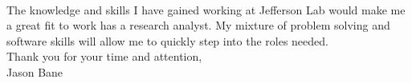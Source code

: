 \documentclass[12pt,letterpaper]{article}
\begin{document}
\paragraph{}The knowledge and skills I have gained working at Jefferson Lab would make me a great fit to work has a research analyst. My mixture of problem solving and software skills will allow me to quickly step into the roles needed.      
\\

\noindent Thank you for your time and attention,\\
\noindent Jason Bane
\end{document}

